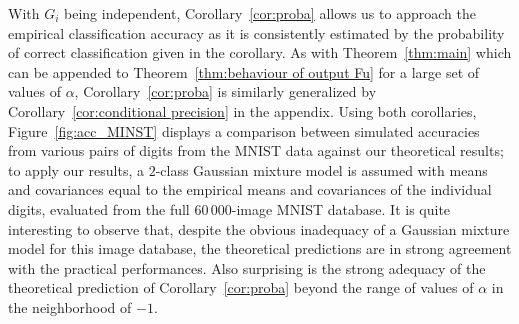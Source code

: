 \documentclass[twoside,11pt]{article}
\begin{document}
With $G_i$ being independent, Corollary~\ref{cor:proba} allows us to approach the empirical classification accuracy as it is consistently estimated by the probability of correct classification given in the corollary. As with Theorem~\ref{thm:main} which can be appended to Theorem~\ref{thm:behaviour of output Fu} for a large set of values of $\alpha$, Corollary~\ref{cor:proba} is similarly generalized by Corollary~\ref{cor:conditional precision} in the appendix. Using both corollaries, Figure~\ref{fig:acc_MINST} displays a comparison between simulated accuracies from various pairs of digits from the MNIST data against our theoretical results; to apply our results, a $2$-class Gaussian mixture model is assumed with means and covariances equal to the empirical means and covariances of the individual digits, evaluated from the full $60\,000$-image MNIST database. %
It is quite interesting to observe that, despite the obvious inadequacy of a Gaussian mixture model for this image database, the theoretical predictions are in strong agreement with the practical performances. Also surprising is the strong adequacy of the theoretical prediction of Corollary~\ref{cor:proba} beyond the range of values of $\alpha$ in the neighborhood of $-1$.
\end{document}
